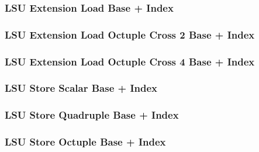 

\subsubsection[{\small LSU Extension Load Base + Index}]{LSU Extension Load Base + Index} \label{sec:format-LSU-XLBI}



\subsubsection[{\small LSU Extension Load Octuple Cross 2 Base + Index}]{LSU Extension Load Octuple Cross 2 Base + Index} \label{sec:format-LSU-XLOC2BI}



\subsubsection[{\small LSU Extension Load Octuple Cross 4 Base + Index}]{LSU Extension Load Octuple Cross 4 Base + Index} \label{sec:format-LSU-XLOC4BI}



\subsubsection[{\small LSU Store Scalar Base + Index}]{LSU Store Scalar Base + Index} \label{sec:format-LSU-SSBI}



\subsubsection[{\small LSU Store Quadruple Base + Index}]{LSU Store Quadruple Base + Index} \label{sec:format-LSU-SQBI}



\subsubsection[{\small LSU Store Octuple Base + Index}]{LSU Store Octuple Base + Index} \label{sec:format-LSU-SOBI}

